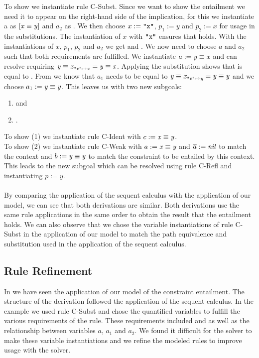 \begin{example}
To show  we instantiate rule C-Subst.
Since we want to show the entailment we need it to appear on the right-hand side of the implication,
for this we instantiate \ovl a as $[\mathit{x} \equiv \mathit{y}]$ and $a_2$ as .
We then choose $x := \texttt{"x"}$, $p_1 := y$ and $p_2 := x$ for usage in the substitutions.
The instantiation of $x$ with $\texttt{"x"}$ ensures that  holds.
With the instantiations of $x$, $p_1$, $p_2$ and $a_2$ we get
 and .
We now need to choose $a$ and $a_2$ such that both  requirements are fulfilled.
We instantiate $a := \mathit{y} \equiv \mathit{x}$ and can resolve 
requiring $\mathit{\mathit{y} \equiv \mathit{x}}_{\mathit{\texttt{"x"}} \mapsto \mathit{x}} = \mathit{y} \equiv \mathit{x}$.
Applying the substitution shows that  is equal to .
From  we know that
$a_1$ needs to be equal to $\mathit{\mathit{y} \equiv \mathit{x}}_{\mathit{\texttt{"x"}} \mapsto \mathit{y}} = \mathit{y} \equiv \mathit{y}$
and we choose $a_1 := \mathit{y} \equiv \mathit{y}$.
This leaves us with two new subgoals:
\begin{enumerate}
    \item {} and
    \item {}.
\end{enumerate}
To show (1) we instantiate rule C-Ident with $c := \mathit{x} \equiv \mathit{y}$.\\
To show (2) we instantiate rule C-Weak with
$a := \mathit{x} \equiv \mathit{y}$ and $\overline{a} := \mathit{nil}$ to match the context
and $b := \mathit{y} \equiv \mathit{y}$ to match the constraint to be entailed by this context.
This leads to the new subgoal  which can be
resolved using rule C-Refl and instantiating $p := y$.\\
\\
By comparing the application of the sequent calculus with the application of our model,
we can see that both derivations are similar.
Both derivations use the same rule applications in the same order to obtain the result
that the entailment holds.
We can also observe that we chose the variable instantiations of rule C-Subst
in the application of our model to match the path equivalence and substitution used
in the application of the sequent calculus.
\end{example}

\subsection{Rule Refinement}
\label{sec:rule-refinement}
In  we have seen the application of our model
of the constraint entailment. The structure of the derivation followed the application
of the sequent calculus.
In the example we used rule C-Subst and chose the quantified variables
to fulfill the various requirements of the rule.
These requirements included  and  as well
as the relationship between variables $a$, $a_1$ and $a_2$.
We found it difficult for the solver to make these variable instantiations
and we refine the modeled rules to improve usage with the solver.

